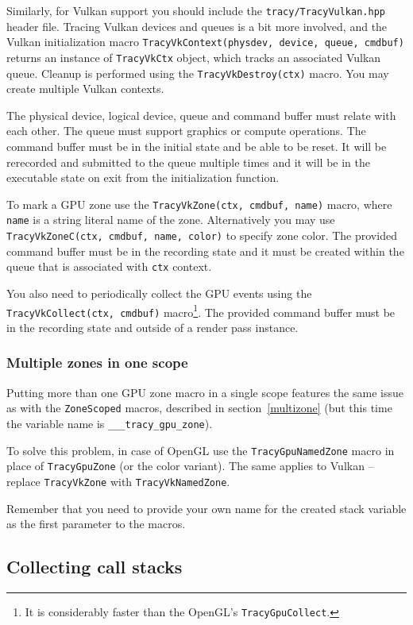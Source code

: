 \documentclass[hidelinks,titlepage,a4paper]{article}
\begin{document}
Similarly, for Vulkan support you should include the \texttt{tracy/TracyVulkan.hpp} header file. Tracing Vulkan devices and queues is a bit more involved, and the Vulkan initialization macro \texttt{TracyVkContext(physdev, device, queue, cmdbuf)} returns an instance of \texttt{TracyVkCtx} object, which tracks an associated Vulkan queue. Cleanup is performed using the \texttt{TracyVkDestroy(ctx)} macro. You may create multiple Vulkan contexts.

The physical device, logical device, queue and command buffer must relate with each other. The queue must support graphics or compute operations. The command buffer must be in the initial state and be able to be reset. It will be rerecorded and submitted to the queue multiple times and it will be in the executable state on exit from the initialization function.

To mark a GPU zone use the \texttt{TracyVkZone(ctx, cmdbuf, name)} macro, where \texttt{name} is a string literal name of the zone. Alternatively you may use \texttt{TracyVkZoneC(ctx, cmdbuf, name, color)} to specify zone color. The provided command buffer must be in the recording state and it must be created within the queue that is associated with \texttt{ctx} context.

You also need to periodically collect the GPU events using the \texttt{TracyVkCollect(ctx, cmdbuf)} macro\footnote{It is considerably faster than the OpenGL's \texttt{TracyGpuCollect}.}. The provided command buffer must be in the recording state and outside of a render pass instance.

\subsubsection{Multiple zones in one scope}

Putting more than one GPU zone macro in a single scope features the same issue as with the \texttt{ZoneScoped} macros, described in section~\ref{multizone} (but this time the variable name is \texttt{\_\_\_tracy\_gpu\_zone}).

To solve this problem, in case of OpenGL use the \texttt{TracyGpuNamedZone} macro in place of \texttt{TracyGpuZone} (or the color variant). The same applies to Vulkan -- replace \texttt{TracyVkZone} with \texttt{TracyVkNamedZone}.

Remember that you need to provide your own name for the created stack variable as the first parameter to the macros.

\subsection{Collecting call stacks}
\label{collectingcallstacks}
\end{document}
